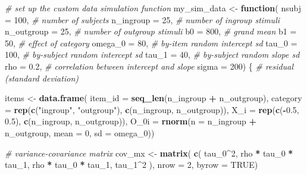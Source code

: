 \documentclass[english,doc,floatsintext]{apa6}
\newenvironment{Shaded}{\begin{snugshade}}{\end{snugshade}}
\newcommand{\CommentTok}[1]{\textcolor[rgb]{0.56,0.35,0.01}{\textit{#1}}}
\newcommand{\ControlFlowTok}[1]{\textcolor[rgb]{0.13,0.29,0.53}{\textbf{#1}}}
\newcommand{\DataTypeTok}[1]{\textcolor[rgb]{0.13,0.29,0.53}{#1}}
\newcommand{\DecValTok}[1]{\textcolor[rgb]{0.00,0.00,0.81}{#1}}
\newcommand{\FloatTok}[1]{\textcolor[rgb]{0.00,0.00,0.81}{#1}}
\newcommand{\KeywordTok}[1]{\textcolor[rgb]{0.13,0.29,0.53}{\textbf{#1}}}
\newcommand{\NormalTok}[1]{#1}
\newcommand{\OperatorTok}[1]{\textcolor[rgb]{0.81,0.36,0.00}{\textbf{#1}}}
\newcommand{\OtherTok}[1]{\textcolor[rgb]{0.56,0.35,0.01}{#1}}
\newcommand{\StringTok}[1]{\textcolor[rgb]{0.31,0.60,0.02}{#1}}
\begin{document}
\begin{Shaded}
\begin{Highlighting}[]
\CommentTok{# set up the custom data simulation function}
\NormalTok{my_sim_data <-}\StringTok{ }\ControlFlowTok{function}\NormalTok{(}
  \DataTypeTok{nsubj      =} \DecValTok{100}\NormalTok{,   }\CommentTok{# number of subjects}
  \DataTypeTok{n_ingroup  =}  \DecValTok{25}\NormalTok{,   }\CommentTok{# number of ingroup stimuli}
  \DataTypeTok{n_outgroup =}  \DecValTok{25}\NormalTok{,   }\CommentTok{# number of outgroup stimuli}
  \DataTypeTok{b0         =} \DecValTok{800}\NormalTok{,   }\CommentTok{# grand mean}
  \DataTypeTok{b1         =}  \DecValTok{50}\NormalTok{,   }\CommentTok{# effect of category}
  \DataTypeTok{omega_0    =}  \DecValTok{80}\NormalTok{,   }\CommentTok{# by-item random intercept sd}
  \DataTypeTok{tau_0      =} \DecValTok{100}\NormalTok{,   }\CommentTok{# by-subject random intercept sd}
  \DataTypeTok{tau_1      =}  \DecValTok{40}\NormalTok{,   }\CommentTok{# by-subject random slope sd}
  \DataTypeTok{rho        =} \FloatTok{0.2}\NormalTok{,   }\CommentTok{# correlation between intercept and slope}
  \DataTypeTok{sigma      =} \DecValTok{200}\NormalTok{) \{ }\CommentTok{# residual (standard deviation)}

\NormalTok{  items <-}\StringTok{ }\KeywordTok{data.frame}\NormalTok{(}
    \DataTypeTok{item_id =} \KeywordTok{seq_len}\NormalTok{(n_ingroup }\OperatorTok{+}\StringTok{ }\NormalTok{n_outgroup),}
    \DataTypeTok{category =} \KeywordTok{rep}\NormalTok{(}\KeywordTok{c}\NormalTok{(}\StringTok{"ingroup"}\NormalTok{, }\StringTok{"outgroup"}\NormalTok{), }\KeywordTok{c}\NormalTok{(n_ingroup, n_outgroup)),}
    \DataTypeTok{X_i =} \KeywordTok{rep}\NormalTok{(}\KeywordTok{c}\NormalTok{(}\OperatorTok{-}\FloatTok{0.5}\NormalTok{, }\FloatTok{0.5}\NormalTok{), }\KeywordTok{c}\NormalTok{(n_ingroup, n_outgroup)),}
    \DataTypeTok{O_0i =} \KeywordTok{rnorm}\NormalTok{(}\DataTypeTok{n =}\NormalTok{ n_ingroup }\OperatorTok{+}\StringTok{ }\NormalTok{n_outgroup, }\DataTypeTok{mean =} \DecValTok{0}\NormalTok{, }\DataTypeTok{sd =}\NormalTok{ omega_}\DecValTok{0}\NormalTok{))}

  \CommentTok{# variance-covariance matrix}
\NormalTok{  cov_mx  <-}\StringTok{ }\KeywordTok{matrix}\NormalTok{(}
    \KeywordTok{c}\NormalTok{(    tau_}\DecValTok{0}\OperatorTok{^}\DecValTok{2}\NormalTok{,         rho }\OperatorTok{*}\StringTok{ }\NormalTok{tau_}\DecValTok{0} \OperatorTok{*}\StringTok{ }\NormalTok{tau_}\DecValTok{1}\NormalTok{,}
\NormalTok{      rho }\OperatorTok{*}\StringTok{ }\NormalTok{tau_}\DecValTok{0} \OperatorTok{*}\StringTok{ }\NormalTok{tau_}\DecValTok{1}\NormalTok{,      tau_}\DecValTok{1}\OperatorTok{^}\DecValTok{2}\NormalTok{        ),}
    \DataTypeTok{nrow =} \DecValTok{2}\NormalTok{, }\DataTypeTok{byrow =} \OtherTok{TRUE}\NormalTok{)}


\end{Highlighting}
\end{Shaded}
\end{document}
